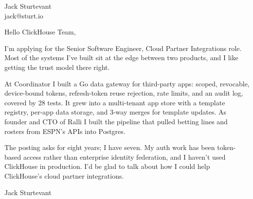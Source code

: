 \documentclass[11pt]{article}
\begin{document}
\raggedright

{\namefont\fontsize{20pt}{24pt}\selectfont Jack Sturtevant}\\[-0.3em]
jack@sturt.io

\vspace{1.2em}

Hello ClickHouse Team,

I'm applying for the Senior Software Engineer, Cloud Partner Integrations role. Most of the systems I've built sit at the edge between two products, and I like getting the trust model there right.

At Coordinator I built a Go data gateway for third-party apps: scoped, revocable, device-bound tokens, refresh-token reuse rejection, rate limits, and an audit log, covered by 28 tests. It grew into a multi-tenant app store with a template registry, per-app data storage, and 3-way merges for template updates. As founder and CTO of Ralli I built the pipeline that pulled betting lines and rosters from ESPN's APIs into Postgres.

The posting asks for eight years; I have seven. My auth work has been token-based access rather than enterprise identity federation, and I haven't used ClickHouse in production. I'd be glad to talk about how I could help ClickHouse's cloud partner integrations.

\vspace{0.6em}
Jack Sturtevant
\end{document}
